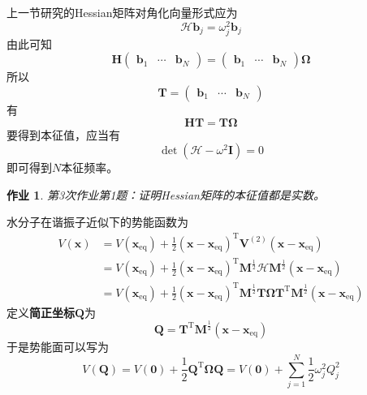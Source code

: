 \documentclass[12pt]{article}
\newtheorem{asg}{作业}
\begin{document}
    上一节研究的Hessian矩阵对角化向量形式应为
    \begin{equation}
        \bm{\mathcal{H}b}_j = \omega_j^2 \bm{b}_j
    \end{equation}
    由此可知 
    \begin{equation}
        \bm{H}
        \begin{pmatrix}
            \bm{b}_1 & \cdots & \bm{b}_N
        \end{pmatrix}
        = 
        \begin{pmatrix}
            \bm{b}_1 & \cdots & \bm{b}_N
        \end{pmatrix}
        \bm{\Omega}
    \end{equation}
    所以
    \begin{equation}
        \bm{T} = 
        \begin{pmatrix}
            \bm{b}_1 & \cdots & \bm{b}_N
        \end{pmatrix}
    \end{equation}
    有
    \begin{equation}
        \bm{HT = T\Omega}
    \end{equation}
    要得到本征值，应当有
    \begin{equation}
        \det (\bm{\mathcal{H}}- \omega^2 \bm{I}) = 0
    \end{equation}
    即可得到$N$本征频率。
    \begin{asg}
        第3次作业第1题：证明Hessian矩阵的本征值都是实数。
    \end{asg}

    水分子在谐振子近似下的势能函数为
    \begin{equation}\begin{aligned}
        V(\bm{x}) &= V(\bm{x}_\mathrm{eq}) + \frac 12 (\bm{x-x}_\mathrm{eq})^\mathrm{T} \bm{V}^{(2)} (\bm{x-x}_\mathrm{eq})\\
        &= V(\bm{x}_\mathrm{eq}) + \frac 12 (\bm{x-x}_\mathrm{eq})^\mathrm{T} \bm{M}^{\frac 12}\bm{\mathcal{H}} \bm{M}^{\frac 12} (\bm{x-x}_\mathrm{eq})\\
        &= V(\bm{x}_\mathrm{eq}) + \frac 12 (\bm{x-x}_\mathrm{eq})^\mathrm{T} \bm{M}^{\frac 12} \bm{T\Omega T}^\mathrm{T} \bm{M}^{\frac 12} (\bm{x-x}_\mathrm{eq})
    \end{aligned}\end{equation}
    定义\textbf{简正坐标}$\bm{Q}$为
    \begin{equation}
        \bm{Q} = \bm{T}^\mathrm{T} \bm{M}^{\frac 12} (\bm{x-x}_\mathrm{eq})
    \end{equation}
    于是势能面可以写为
    \begin{equation}
        V(\bm{Q}) = V(\bm{0}) + \frac 12 \bm{Q}^\mathrm{T} \bm{\Omega Q} = V(\bm{0}) + \sum_{j=1}^N \frac 12 \omega_j^2 Q_j^2
    \end{equation}
\end{document}
